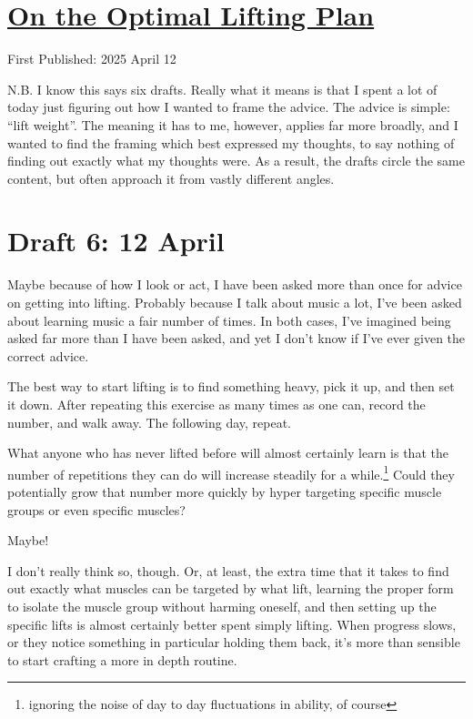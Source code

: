 \documentclass[12pt]{article}
\newcommand{\say}[1]{``#1''}
\renewcommand{\,}{\textsuperscript{,}}
\begin{document}
  
\doublespacing  
\section{\href{optimizing-lifting.html}{On the Optimal Lifting Plan}}  
First Published: 2025 April 12

N.B. I know this says six drafts.  
Really what it means is that I spent a lot of today just figuring out how I wanted to frame the advice.  
The advice is simple: \say{lift weight}.  
The meaning it has to me, however, applies far more broadly, and I wanted to find the framing which best expressed my thoughts, to say nothing of finding out exactly what my thoughts were.  
As a result, the drafts circle the same content, but often approach it from vastly different angles.

\section{Draft 6: 12 April}

Maybe because of how I look or act, I have been asked more than once for advice on getting into lifting.  
Probably because I talk about music a lot, I've been asked about learning music a fair number of times.  
In both cases, I've imagined being asked far more than I have been asked, and yet I don't know if I've ever given the correct advice.

The best way to start lifting is to find something heavy, pick it up, and then set it down.  
After repeating this exercise as many times as one can, record the number, and walk away.  
The following day, repeat.

What anyone who has never lifted before will almost certainly learn is that the number of repetitions they can do will increase steadily for a while.\footnote{ignoring the noise of day to day fluctuations in ability, of course}  
Could they potentially grow that number more quickly by hyper targeting specific muscle groups or even specific muscles?

Maybe!

I don't really think so, though.  
Or, at least, the extra time that it takes to find out exactly what muscles can be targeted by what lift, learning the proper form to isolate the muscle group without harming oneself, and then setting up the specific lifts is almost certainly better spent simply lifting.  
When progress slows, or they notice something in particular holding them back, it's more than sensible to start crafting a more in depth routine.
\end{document}

